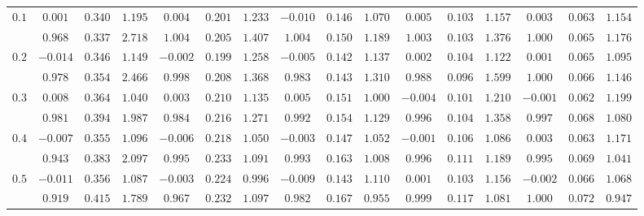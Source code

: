 \begin{table}
\begin{center}
\begin{tabular}{|c|ccc|ccc|ccc|ccc|ccc|}
\hline 
$0.1$ & $ 0.001 $ & $ 0.340 $ & $ 1.195 $ & $ 0.004 $ & $ 0.201 $ & $ 1.233 $ & $ -0.010 $ & $ 0.146 $ & $ 1.070 $ & $ 0.005 $ & $ 0.103 $ & $ 1.157 $ & $ 0.003 $ & $ 0.063 $ & $ 1.154 $\\ 
 & $ 0.968 $ & $ 0.337 $ & $ 2.718 $ & $ 1.004 $ & $ 0.205 $ & $ 1.407 $ & $ 1.004 $ & $ 0.150 $ & $ 1.189 $ & $ 1.003 $ & $ 0.103 $ & $ 1.376 $ & $ 1.000 $ & $ 0.065 $ & $ 1.176 $\\ 
\hline 
$0.2$ & $ -0.014 $ & $ 0.346 $ & $ 1.149 $ & $ -0.002 $ & $ 0.199 $ & $ 1.258 $ & $ -0.005 $ & $ 0.142 $ & $ 1.137 $ & $ 0.002 $ & $ 0.104 $ & $ 1.122 $ & $ 0.001 $ & $ 0.065 $ & $ 1.095 $\\ 
 & $ 0.978 $ & $ 0.354 $ & $ 2.466 $ & $ 0.998 $ & $ 0.208 $ & $ 1.368 $ & $ 0.983 $ & $ 0.143 $ & $ 1.310 $ & $ 0.988 $ & $ 0.096 $ & $ 1.599 $ & $ 1.000 $ & $ 0.066 $ & $ 1.146 $\\ 
\hline 
$0.3$ & $ 0.008 $ & $ 0.364 $ & $ 1.040 $ & $ 0.003 $ & $ 0.210 $ & $ 1.135 $ & $ 0.005 $ & $ 0.151 $ & $ 1.000 $ & $ -0.004 $ & $ 0.101 $ & $ 1.210 $ & $ -0.001 $ & $ 0.062 $ & $ 1.199 $\\ 
 & $ 0.981 $ & $ 0.394 $ & $ 1.987 $ & $ 0.984 $ & $ 0.216 $ & $ 1.271 $ & $ 0.992 $ & $ 0.154 $ & $ 1.129 $ & $ 0.996 $ & $ 0.104 $ & $ 1.358 $ & $ 0.997 $ & $ 0.068 $ & $ 1.080 $\\ 
\hline 
$0.4$ & $ -0.007 $ & $ 0.355 $ & $ 1.096 $ & $ -0.006 $ & $ 0.218 $ & $ 1.050 $ & $ -0.003 $ & $ 0.147 $ & $ 1.052 $ & $ -0.001 $ & $ 0.106 $ & $ 1.086 $ & $ 0.003 $ & $ 0.063 $ & $ 1.171 $\\ 
 & $ 0.943 $ & $ 0.383 $ & $ 2.097 $ & $ 0.995 $ & $ 0.233 $ & $ 1.091 $ & $ 0.993 $ & $ 0.163 $ & $ 1.008 $ & $ 0.996 $ & $ 0.111 $ & $ 1.189 $ & $ 0.995 $ & $ 0.069 $ & $ 1.041 $\\ 
\hline 
$0.5$ & $ -0.011 $ & $ 0.356 $ & $ 1.087 $ & $ -0.003 $ & $ 0.224 $ & $ 0.996 $ & $ -0.009 $ & $ 0.143 $ & $ 1.110 $ & $ 0.001 $ & $ 0.103 $ & $ 1.156 $ & $ -0.002 $ & $ 0.066 $ & $ 1.068 $\\ 
 & $ 0.919 $ & $ 0.415 $ & $ 1.789 $ & $ 0.967 $ & $ 0.232 $ & $ 1.097 $ & $ 0.982 $ & $ 0.167 $ & $ 0.955 $ & $ 0.999 $ & $ 0.117 $ & $ 1.081 $ & $ 1.000 $ & $ 0.072 $ & $ 0.947 $\\ 
\hline 

\end{tabular}
\end{center}
\end{table}
